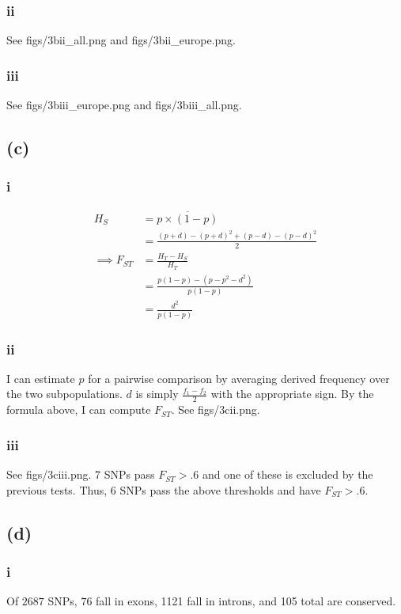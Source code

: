 \documentclass[12pt,draft,a4paper]{article}
\begin{document}
\subsubsection*{ii}

See figs/3bii\_all.png and figs/3bii\_europe.png.

\subsubsection*{iii}

See figs/3biii\_europe.png and figs/3biii\_all.png.

\subsection*{(c)}
\subsubsection*{i}
\begin{align*} H_S &= \overline{p\times(1 - p)}\\
&=\frac{\left(p+d\right) - \left(p+d\right)^2 + \left(p-d\right) - \left(p-d\right)^2}{2}\\
\implies F_{ST} &= \frac{H_T - H_S}{H_T}\\
&= \frac{ p(1-p) - (p-p^2-d^2)}{p(1-p)}\\
&=\frac{d^2}{p(1-p)}\end{align*}

\subsubsection*{ii}
I can estimate $p$ for a pairwise comparison by averaging derived frequency over the two subpopulations. $d$ is simply $\frac{f_1 - f_2}{2}$ with the appropriate sign. By the formula above, I can compute $F_{ST}$. See figs/3cii.png.

\subsubsection*{iii}
See figs/3ciii.png. 7 SNPs pass $F_{ST}>.6$ and one of these is excluded by the previous tests. Thus, 6 SNPs pass the above thresholds and have $F_{ST} > .6$.


\subsection*{(d)}
\subsubsection*{i}
Of $2687$ SNPs, $76$ fall in exons, 1121 fall in introns, and 105 total are conserved.
\end{document}

